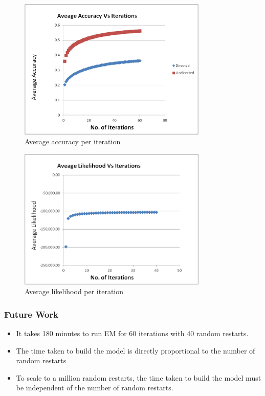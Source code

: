 \documentclass{beamer}
\begin{document}
\begin{frame}

\begin{figure}[!ht]
\centering
\includegraphics[width=90mm]{images/avg_accuracy.png}
\caption{Average accuracy per iteration}
\label{overflow}
\end{figure}

\end{frame}

\begin{frame}

\begin{figure}[!ht]
\centering
\includegraphics[width=90mm]{images/avg_likelihood.png}
\caption{Average likelihood per iteration}
\label{overflow}
\end{figure}

\end{frame}



\begin{frame}
\frametitle{Future Work}

\begin{itemize}
\item It takes 180 minutes to run EM for 60 iterations with 40 random restarts.

\item The time taken to build the model is directly proportional to the number of random restarts

\item To scale to a million random restarts, the time taken to build the model must be independent of the number of random restarts.

\end{itemize}
\end{frame}
\end{document}
